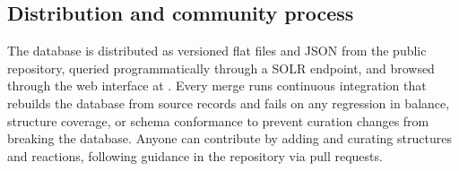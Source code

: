 \subsection{Distribution and community process}\label{sec:methods-distribution}

The database is distributed as versioned flat files and JSON from the public repository, queried programmatically through a SOLR endpoint, and browsed through the web interface at \modelseedurl.
Every merge runs continuous integration that rebuilds the database from source records and fails on any regression in balance, structure coverage, or schema conformance to prevent curation changes from breaking the database.
Anyone can contribute by adding and curating structures and reactions, following guidance in the repository via pull requests.